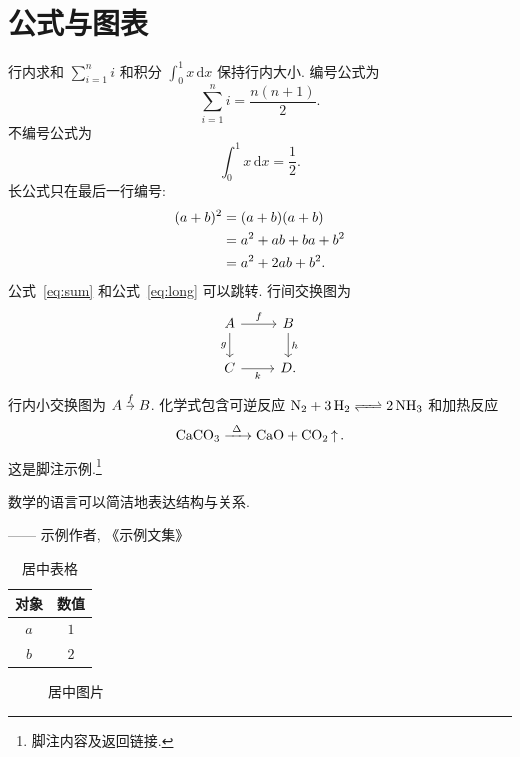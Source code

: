 \documentclass[UTF8,12pt,oneside,fontset=fandol]{ctexbook}
\theoremstyle{mtfang}
\theoremstyle{definition}
\newenvironment{quotationbox}{\begin{tcolorbox}[colback=accent!5,
    colframe=accent!55,boxrule=.5pt]\small\kaishu}{\end{tcolorbox}}
\newcommand{\quoteauthor}[1]{\par\hfill —— #1}
\begin{document}
\section{公式与图表}
行内求和 $\sum_{i = 1}^{n} i$ 和积分 $\int_0^1 x\,\mathrm{d}x$
保持行内大小. 编号公式为
\begin{equation}\label{eq:sum}
    \sum_{i = 1}^{n} i = \frac{n(n + 1)}{2}.
\end{equation}
不编号公式为
\[
    \int_0^1 x\,\mathrm{d}x = \frac{1}{2}.
\]
长公式只在最后一行编号:
\begin{align}
    (a + b)^2 & = (a + b)(a + b) \notag \\
    & = a^2 + ab + ba + b^2 \notag \\
    & = a^2 + 2ab + b^2. \label{eq:long}
\end{align}
公式~\eqref{eq:sum} 和公式~\eqref{eq:long} 可以跳转.
行间交换图为
\[
    \begin{tikzcd}
        A \arrow[r, "f"] \arrow[d, "g"'] & B \arrow[d, "h"] \\
        C \arrow[r, "k"'] & D.
    \end{tikzcd}
\]
行内小交换图为
$\begin{tikzcd}[ampersand replacement=\&,cramped,sep=tiny]
    A \arrow[r, "f"] \& B
\end{tikzcd}$.
化学式包含可逆反应 $\ce{N2 + 3H2 <=> 2NH3}$ 和加热反应
\[
    \ce{CaCO3 ->[\Delta] CaO + CO2 ^}.
\]
这是脚注示例.\footnote{脚注内容及返回链接.}
\begin{quotationbox}
    数学的语言可以简洁地表达结构与关系.
    \quoteauthor{示例作者, 《示例文集》}
\end{quotationbox}
\begin{table}[htbp]
    \centering
    \caption{居中表格}\label{tab:sample}
    \begin{tabular}{cc}
        \toprule
        对象 & 数值 \\
        \midrule
        $a$ & $1$ \\
        $b$ & $2$ \\
        \bottomrule
    \end{tabular}
\end{table}
\begin{figure}[htbp]
    \centering
    \caption{居中图片}\label{fig:single}
\end{figure}
\end{document}
